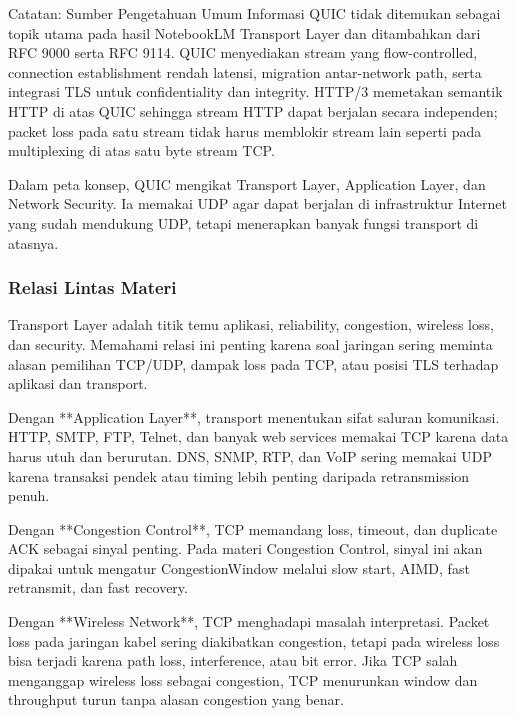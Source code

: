 \begin{cmt}{Catatan: Sumber Pengetahuan Umum}{}
Informasi QUIC tidak ditemukan sebagai topik utama pada hasil NotebookLM Transport Layer dan ditambahkan dari RFC 9000 serta RFC 9114. QUIC menyediakan stream yang flow-controlled, connection establishment rendah latensi, migration antar-network path, serta integrasi TLS untuk confidentiality dan integrity. HTTP/3 memetakan semantik HTTP di atas QUIC sehingga stream HTTP dapat berjalan secara independen; packet loss pada satu stream tidak harus memblokir stream lain seperti pada multiplexing di atas satu byte stream TCP.
\end{cmt}

Dalam peta konsep, QUIC mengikat Transport Layer, Application Layer, dan Network Security. Ia memakai UDP agar dapat berjalan di infrastruktur Internet yang sudah mendukung UDP, tetapi menerapkan banyak fungsi transport di atasnya.

\subsubsection{Relasi Lintas Materi}
\begin{jawab}
Transport Layer adalah titik temu aplikasi, reliability, congestion, wireless loss, dan security. Memahami relasi ini penting karena soal jaringan sering meminta alasan pemilihan TCP/UDP, dampak loss pada TCP, atau posisi TLS terhadap aplikasi dan transport.
\end{jawab}

Dengan **Application Layer**, transport menentukan sifat saluran komunikasi. HTTP, SMTP, FTP, Telnet, dan banyak web services memakai TCP karena data harus utuh dan berurutan. DNS, SNMP, RTP, dan VoIP sering memakai UDP karena transaksi pendek atau timing lebih penting daripada retransmission penuh.

Dengan **Congestion Control**, TCP memandang loss, timeout, dan duplicate ACK sebagai sinyal penting. Pada materi Congestion Control, sinyal ini akan dipakai untuk mengatur CongestionWindow melalui slow start, AIMD, fast retransmit, dan fast recovery.

Dengan **Wireless Network**, TCP menghadapi masalah interpretasi. Packet loss pada jaringan kabel sering diakibatkan congestion, tetapi pada wireless loss bisa terjadi karena path loss, interference, atau bit error. Jika TCP salah menganggap wireless loss sebagai congestion, TCP menurunkan window dan throughput turun tanpa alasan congestion yang benar.

